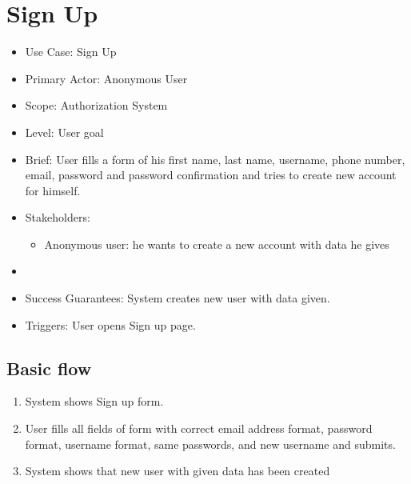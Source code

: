 \documentclass[11pt]{article}
\begin{document}
\section{Sign Up}
\begin{itemize}
\item
Use Case: Sign Up
\item
Primary Actor: Anonymous User
\item
Scope: Authorization System
\item
Level: User goal
\item
Brief: User fills a form of his first name, last name, username, phone number, email, password and password confirmation and tries to create new account for himself.
\item
Stakeholders:
\begin{itemize}
\item
Anonymous user: he wants to create a new account with data he gives
\end{itemize}
\item
\item
Success Guarantees: System creates new user with data given.
\item
Triggers:
User opens Sign up page.
\end{itemize}
\subsection{Basic flow}
\begin{enumerate}
\item
System shows Sign up form.
\item
User fills all fields of form with correct email address format, password format, username format, same passwords, and new username and submits.
\item
System shows that new user with given data has been created
\end{enumerate}
\end{document}
